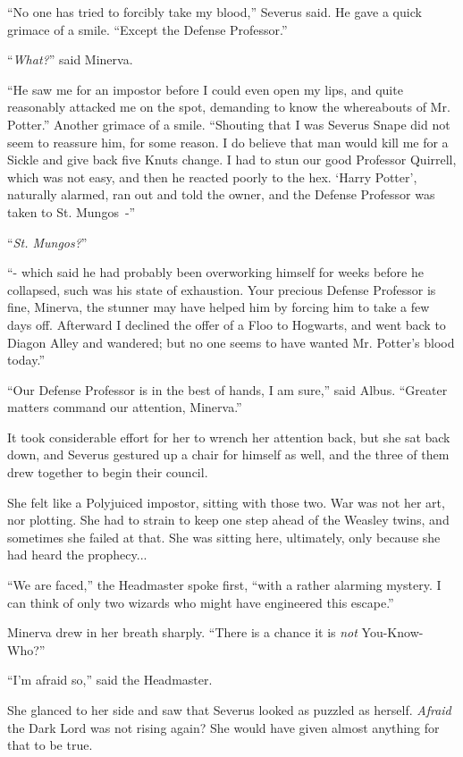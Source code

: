 ``No one has tried to forcibly take my blood,'' Severus said. He gave a quick grimace of a smile. ``Except the Defense Professor.''

``\emph{What?}'' said Minerva.

``He saw me for an impostor before I could even open my lips, and quite reasonably attacked me on the spot, demanding to know the whereabouts of Mr. Potter.'' Another grimace of a smile. ``Shouting that I was Severus Snape did not seem to reassure him, for some reason. I do believe that man would kill me for a Sickle and give back five Knuts change. I had to stun our good Professor Quirrell, which was not easy, and then he reacted poorly to the hex. `Harry Potter', naturally alarmed, ran out and told the owner, and the Defense Professor was taken to St. Mungos~-''

``\emph{St. Mungos?}''

``- which said he had probably been overworking himself for weeks before he collapsed, such was his state of exhaustion. Your precious Defense Professor is fine, Minerva, the stunner may have helped him by forcing him to take a few days off. Afterward I declined the offer of a Floo to Hogwarts, and went back to Diagon Alley and wandered; but no one seems to have wanted Mr. Potter's blood today.''

``Our Defense Professor is in the best of hands, I am sure,'' said Albus. ``Greater matters command our attention, Minerva.''

It took considerable effort for her to wrench her attention back, but she sat back down, and Severus gestured up a chair for himself as well, and the three of them drew together to begin their council.

She felt like a Polyjuiced impostor, sitting with those two. War was not her art, nor plotting. She had to strain to keep one step ahead of the Weasley twins, and sometimes she failed at that. She was sitting here, ultimately, only because she had heard the prophecy...

``We are faced,'' the Headmaster spoke first, ``with a rather alarming mystery. I can think of only two wizards who might have engineered this escape.''

Minerva drew in her breath sharply. ``There is a chance it is \emph{not} You-Know-Who?''

``I'm afraid so,'' said the Headmaster.

She glanced to her side and saw that Severus looked as puzzled as herself. \emph{Afraid} the Dark Lord was not rising again? She would have given almost anything for that to be true.

